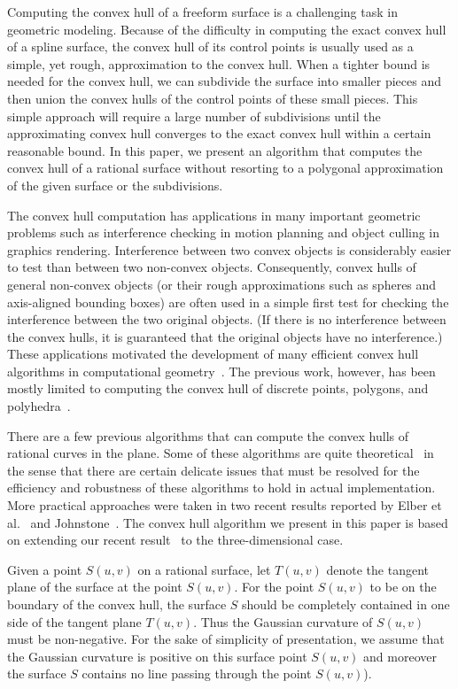 \documentclass[11pt]{article}          %
\begin{document}
Computing the convex hull of a freeform surface
is a challenging task in geometric modeling.
Because of the difficulty in computing the exact convex hull
of a spline surface, the convex hull of its control points is usually
used as a simple, yet rough, approximation to the convex hull.
When a tighter bound is needed for the convex hull, we can subdivide
the surface into smaller pieces and then union the convex hulls of
the control points of these small pieces. 
This simple approach will require a large number of subdivisions 
until the approximating convex hull converges to the exact convex hull
within a certain reasonable bound.  In this paper, we present
an algorithm that computes the convex hull of a rational surface
without resorting to a polygonal approximation of the given surface
or the subdivisions.

The convex hull computation has applications in many important
geometric problems such as interference checking in motion planning
and object culling in graphics rendering.  Interference between two convex
objects is considerably easier to test than between two non-convex objects.
Consequently, convex hulls of general non-convex objects (or their rough
approximations such as spheres and axis-aligned bounding boxes) are often used
in a simple first test for checking the interference between the two
original objects.   (If there is no interference between the convex hulls,
it is guaranteed that the original objects have no interference.)
These applications motivated the development of many efficient
convex hull algorithms in computational geometry~\cite{Prep85}.
The previous work, however, has been mostly limited to computing
the convex hull of discrete points, polygons, and
polyhedra~\cite{Graham83,Lee83,Prep85}.

There are a few previous algorithms that can compute the convex hulls
of rational curves in the plane.  Some of these algorithms are quite
theoretical~\cite{Kim91,Souvaine90,Schaeffer87} in the sense that
there are certain delicate issues that must be resolved for the efficiency
and robustness of these algorithms to hold in actual implementation.
More practical approaches were taken in two recent results reported
by Elber et al.~\cite{Elber2001b} and Johnstone~\cite{Johnstone2001}.
The convex hull algorithm we present in this paper is based on
extending our recent result~\cite{Elber2001b} to the three-dimensional case.

Given a point $S(u,v)$ on a rational surface, let $T(u,v)$ denote
the tangent plane of the surface at the point $S(u,v)$.
For the point $S(u,v)$ to be on the boundary of the convex hull,
the surface $S$ should be completely contained in one side of
the tangent plane $T(u,v)$.  Thus the Gaussian curvature of $S(u,v)$ 
must be non-negative.  For the sake of simplicity of presentation,
we assume that the Gaussian curvature is positive
on this surface point $S(u,v)$ and moreover the surface $S$ contains
no line passing through the point $S(u,v)$).
\end{document}
